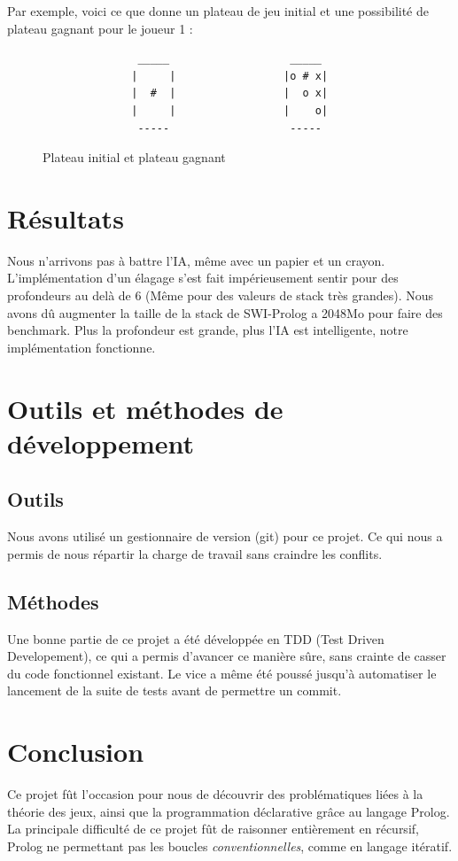 \documentclass[a4paper,12pt]{article}
\begin{document}
Par exemple, voici ce que donne un plateau de jeu initial et une possibilité de plateau gagnant pour le joueur 1 :
\begin{figure}[H]
    \begin{verbatim}
               _____                   _____
              |     |                 |o # x|
              |  #  |                 |  o x|
              |     |                 |    o|
               -----                   -----
    \end{verbatim}
    \caption{Plateau initial et plateau gagnant}
\end{figure}
  
\section{Résultats}
Nous n'arrivons pas à battre l'IA, même avec un papier et un crayon. L'implémentation d'un élagage s'est fait impérieusement sentir pour des profondeurs au delà de 6 (Même pour des valeurs de stack très grandes). Nous avons dû augmenter la taille de la stack de SWI-Prolog a 2048Mo pour faire des benchmark. Plus la profondeur est grande, plus l'IA est intelligente, notre implémentation fonctionne.

\section{Outils et méthodes de développement}
\subsection{Outils}
Nous avons utilisé un gestionnaire de version (git) pour ce projet. Ce qui nous a permis de nous répartir la charge de travail sans craindre les conflits. 
\subsection{Méthodes}
Une bonne partie de ce projet a été développée en TDD (Test Driven Developement), ce qui a permis d'avancer ce manière sûre, sans crainte de casser du code fonctionnel existant. Le vice a même été poussé jusqu'à automatiser le lancement de la suite de tests avant de permettre un commit.

\section{Conclusion}
Ce projet fût l'occasion pour nous de découvrir des problématiques liées à la théorie des jeux, ainsi que la programmation déclarative grâce au langage Prolog. La principale difficulté de ce projet fût de raisonner entièrement en récursif, Prolog ne permettant pas les boucles \emph{conventionnelles}, comme en langage itératif.
\end{document}
